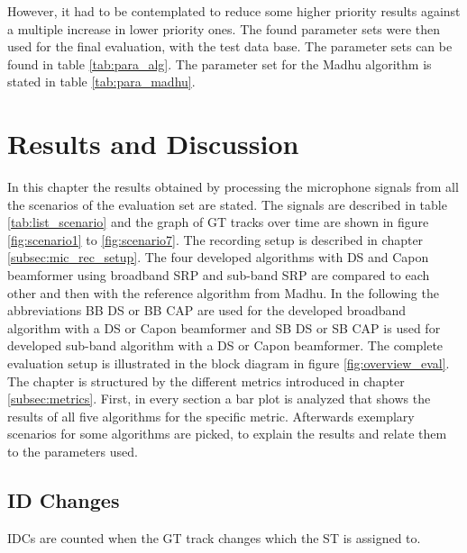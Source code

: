 However, it had to be contemplated to reduce some higher priority results against a multiple increase in lower priority ones. The found parameter sets were then used for the final evaluation, with the test data base. The parameter sets can be found in table \ref{tab:para_alg}. The parameter set for the Madhu algorithm is stated in table \ref{tab:para_madhu}.

\section{Results and Discussion}
\label{sec:results_discussion}

In this chapter the results obtained by processing the microphone signals from all the scenarios of the evaluation set are stated. The signals are described in table \ref{tab:list_scenario} and the graph of \ac{GT} tracks over time are shown in figure \ref{fig:scenario1} to \ref{fig:scenario7}. The recording setup is described in chapter \ref{subsec:mic_rec_setup}. The four developed algorithms with \ac{DS} and Capon beamformer using broadband \ac{SRP} and sub-band \ac{SRP} are compared to each other and then with the reference algorithm from Madhu. In the following the abbreviations BB \ac{DS} or BB CAP are used for the developed broadband algorithm with a \ac{DS} or Capon beamformer and SB \ac{DS} or SB CAP is used for developed sub-band algorithm with a \ac{DS} or Capon beamformer. The complete evaluation setup is illustrated in the block diagram in figure \ref{fig:overview_eval}. The chapter is structured by the different metrics introduced in chapter \ref{subsec:metrics}. First, in every section a bar plot is analyzed that shows the results of all five algorithms for the specific metric. Afterwards exemplary scenarios for some algorithms are picked, to explain the results and relate them to the parameters used.

\subsection{ID Changes}
\label{subsec:idc}
\acp{IDC} are counted when the \ac{GT} track changes which the \ac{ST} is assigned to.\\

